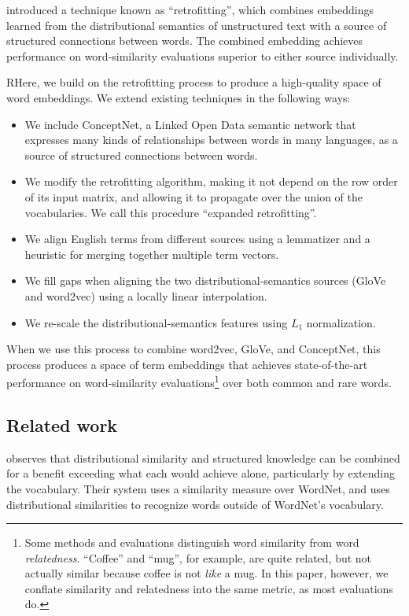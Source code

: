 \documentclass[11pt,letterpaper]{article}
\begin{document}
 introduced a technique
known as ``retrofitting'', which combines embeddings learned from the
distributional semantics of unstructured text with a source of structured
connections between words. The combined embedding achieves performance on
word-similarity evaluations superior to either source individually.

RHere, we build on the retrofitting process to produce a high-quality space of
word embeddings. We extend existing techniques in the following ways:

\begin{itemize}
\item We include ConceptNet, a Linked Open Data semantic network that expresses
many kinds of relationships between words in many languages, as a source of
structured connections between words.
\item We modify the retrofitting algorithm, making it not depend on the row
order of its input matrix, and allowing it to propagate over the union of the
vocabularies. We call this procedure ``expanded retrofitting''.
\item We align English terms from different sources using a lemmatizer and a
heuristic for merging together multiple term vectors.
\item We fill gaps when aligning the two distributional-semantics sources
(GloVe and word2vec) using a locally linear interpolation.
\item We re-scale the distributional-semantics features using $L_1$ normalization.
\end{itemize}

When we use this process to combine word2vec, GloVe, and ConceptNet, this
process produces a space of term embeddings
that achieves state-of-the-art performance on word-similarity
evaluations\footnote{Some methods and evaluations \cite{agirre2009study}
distinguish word similarity from word
{\em relatedness}. ``Coffee'' and ``mug'', for example, are quite related,
but not actually similar because coffee is not {\em like} a mug. In this paper,
however, we conflate similarity and relatedness into the same metric, as most
evaluations do.}
over both common and rare words.


\subsection{Related work}

 observes that distributional similarity and
structured knowledge can be combined for a benefit exceeding what each would
achieve alone, particularly by extending the vocabulary. Their system uses a
similarity measure over WordNet, and uses distributional similarities to
recognize words outside of WordNet's vocabulary.
\end{document}
